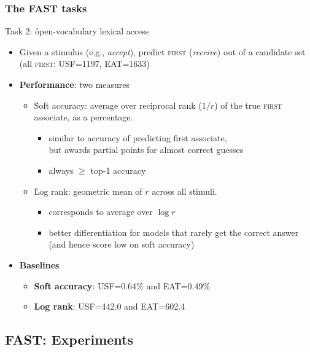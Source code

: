 \documentclass[t]{beamer} %
\begin{document}
\begin{frame}
  \frametitle{The FAST tasks}
  
  Task 2: \h{open-vocabulary lexical access}
  \begin{itemize}
  \item Given a stimulus (e.g.,  \textit{accept}), predict \textsc{first} (\textit{receive}) out of a candidate set (all \textsc{first}: USF=1197, EAT=1633)
  \item \textbf{Performance}: two measures
    \begin{itemize} \footnotesize
    \item \h{Soft accuracy}: average over reciprocal rank ($1/r$) of the true \textsc{first} associate, as a percentage. 
      \begin{itemize} 
      \item similar to accuracy of predicting first associate,\\ but awards partial points for almost correct guesses
      \item always $\geq$ top-1 accuracy
      \end{itemize}        
    \item \h{Log rank}: geometric mean of $r$ across all stimuli. 
      \begin{itemize} 
      \item corresponds to average over $\log r$
      \item better differentiation for models that rarely get the correct answer (and hence score low on soft accuracy)
      \end{itemize}        
    \end{itemize}    		   
  \item \textbf{Baselines}
    \begin{itemize} \footnotesize
    \item \textbf{Soft accuracy}: USF=0.64\% and EAT=0.49\%
    \item \textbf{Log rank}: USF=442.0 and EAT=602.4        
    \end{itemize}              
  \end{itemize}
\end{frame}
  

\subsection{FAST: Experiments}
\end{document}

